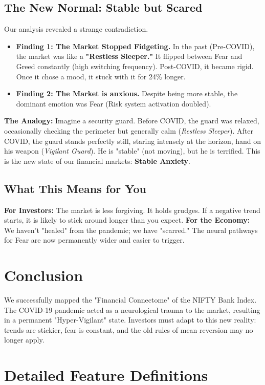 \documentclass[12pt, oneside]{article}
\begin{document}
\subsection{The New Normal: Stable but Scared}
Our analysis revealed a strange contradiction.
\begin{itemize}
    \item \textbf{Finding 1: The Market Stopped Fidgeting.} In the past (Pre-COVID), the market was like a \textbf{"Restless Sleeper."} It flipped between Fear and Greed constantly (high switching frequency). Post-COVID, it became rigid. Once it chose a mood, it stuck with it for 24\% longer.
    \item \textbf{Finding 2: The Market is anxious.} Despite being more stable, the dominant emotion was Fear (Risk system activation doubled).
\end{itemize}

\textbf{The Analogy:} Imagine a security guard.
Before COVID, the guard was relaxed, occasionally checking the perimeter but generally calm (\textit{Restless Sleeper}).
After COVID, the guard stands perfectly still, staring intensely at the horizon, hand on his weapon (\textit{Vigilant Guard}). He is "stable" (not moving), but he is terrified. This is the new state of our financial markets: \textbf{Stable Anxiety}.

\subsection{What This Means for You}
\textbf{For Investors:} The market is less forgiving. It holds grudges. If a negative trend starts, it is likely to stick around longer than you expect.
\textbf{For the Economy:} We haven't "healed" from the pandemic; we have "scarred." The neural pathways for Fear are now permanently wider and easier to trigger.

\section{Conclusion}

We successfully mapped the "Financial Connectome" of the NIFTY Bank Index. The COVID-19 pandemic acted as a neurological trauma to the market, resulting in a permanent "Hyper-Vigilant" state. Investors must adapt to this new reality: trends are stickier, fear is constant, and the old rules of mean reversion may no longer apply.

\newpage
\appendix
\section{Detailed Feature Definitions}
\end{document}
